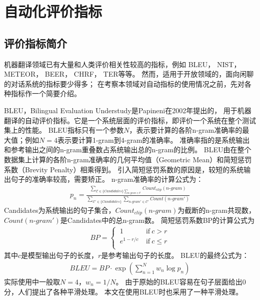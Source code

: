 \section{自动化评价指标}\label{sec:automatic_metric}
\subsection{评价指标简介}\label{subsec:metrics_intro}
机器翻译领域已有大量和人类评价相关性较高的指标，例如
BLEU，
NIST，
METEOR，
BEER，
CHRF，
TER等等。
然而，适用于开放领域的，面向闲聊的对话系统的指标要少得多；
在考察本领域对自动指标的使用情况之前，先对各种指标作一个简要介绍。

BLEU，Bilingual Evaluation Understudy是Papineni在2002年提出的，
用于机器翻译的自动评价指标。它是一个系统层面的评价指标，即评价一个系统在整个测试集上的性能。
BLEU指标只有一个参数$N$，表示要计算的各阶n-gram准确率的最大值；例如$N = 4$表示要计算1-gram到4-gram的准确率。
准确率指的是系统输出和参考输出之间的n-gram重叠数占系统输出总的n-gram的比例。
BLEU由在整个数据集上计算的各阶n-gram准确率的几何平均值（Geometric Mean）和简短惩罚系数（Brevity Penalty）相乘得到。
引入简短惩罚系数的原因是，较短的系统输出句子的准确率较高，需要矫正。
n-gram准确率的计算公式为：
\begin{align}
    p_n = \frac{
    \sum_{\mathcal{C} \in \{\textit{Candidates}\}
    \sum_{\textit{n-gram} \in \mathcal{C}}}
    \textit{Count}_{\textit{clip}}(\textit{n-gram})
    }{
    \sum_{\mathcal{C'} \in \{\textit{Candidates}\}}
    \sum_{\textit{n-gram}' \in \mathcal{C'}}
    \textit{Count}(\textit{n-gram}')
    }
\end{align}
Candidates为系统输出的句子集合，$\textit{Count}_{\textit{clip}}(\textit{n-gram})$为截断的n-gram共现数，
$\textit{Count}(\textit{n-gram}')$是Candidates中的总n-gram数。
简短惩罚系数BP的计算公式为
\begin{align}
    \textit{BP} =
    \begin{cases}
        \ 1 \ & \text{if} \  c > r \\
        \ e^{1 - r/c} \ & \text{if} \  c \leq r \\
    \end{cases}
\end{align}
其中$c$是模型输出句子的长度，$r$是参考输出句子的长度。
BLEU的最终公式为：
\begin{align}
    \textit{BLEU} = \textit{BP} \cdot \exp \left( \sum_{n=1}^N w_n \log p_n \right)
\end{align}
实际使用中一般取$N = 4$，$w_n = 1 / N$。
由于原始的BLEU容易在句子层面给出0分，人们提出了各种平滑处理。
本文在使用BLEU时也采用了一种平滑处理。

